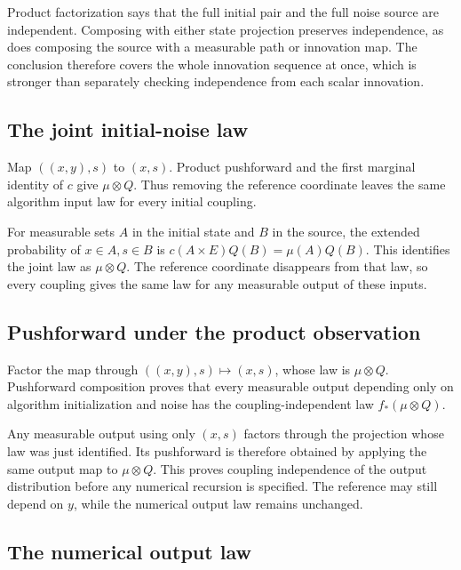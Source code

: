 \documentclass[11pt,a4paper]{article}
\begin{document}
Product factorization says that the full initial pair and the full noise source are independent. Composing with either state projection preserves independence, as does composing the source with a measurable path or innovation map. The conclusion therefore covers the whole innovation sequence at once, which is stronger than separately checking independence from each scalar innovation.


\subsection{\texorpdfstring{The joint initial-noise law}{The joint initial-noise law}}


Map \(((x,y),s)\) to \((x,s)\). Product pushforward and the first marginal identity of \(c\) give \(\mu\otimes Q\). Thus removing the reference coordinate leaves the same algorithm input law for every initial coupling.



For measurable sets \(A\) in the initial state and \(B\) in the source, the extended probability of \(x\in A,s\in B\) is \(c(A\times E)Q(B)=\mu(A)Q(B)\). This identifies the joint law as \(\mu\otimes Q\). The reference coordinate disappears from that law, so every coupling gives the same law for any measurable output of these inputs.


\subsection{\texorpdfstring{Pushforward under the product observation}{Pushforward under the product observation}}


Factor the map through \(((x,y),s)\mapsto(x,s)\), whose law is \(\mu\otimes Q\). Pushforward composition proves that every measurable output depending only on algorithm initialization and noise has the coupling-independent law \(f_*(\mu\otimes Q)\).



Any measurable output using only \((x,s)\) factors through the projection whose law was just identified. Its pushforward is therefore obtained by applying the same output map to \(\mu\otimes Q\). This proves coupling independence of the output distribution before any numerical recursion is specified. The reference may still depend on \(y\), while the numerical output law remains unchanged.


\subsection{\texorpdfstring{The numerical output law}{The numerical output law}}
\end{document}

